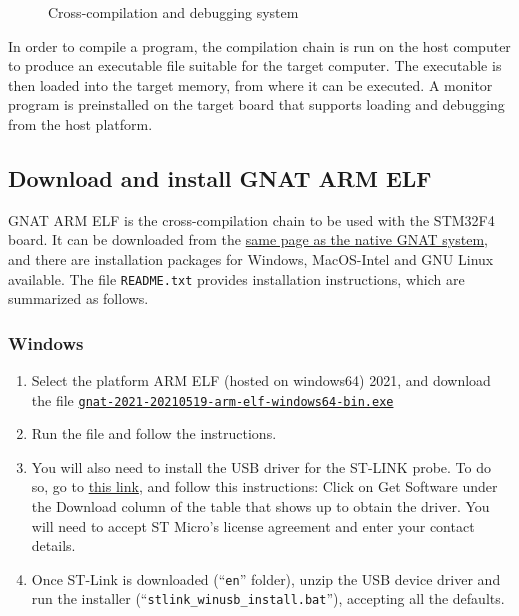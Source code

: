 \begin{figure}[hbtp!]
    \caption{Cross-compilation and debugging system}
    \label{fig:cross}
\end{figure}

In order to compile a program, the compilation chain is run on the host computer to produce an executable file suitable for the target computer.
The executable is then loaded into the target memory,
from where it can be executed.
A monitor program is preinstalled on the target board
that supports loading and debugging from the host platform.

\subsection{Download and install GNAT ARM ELF}

GNAT ARM ELF is the cross-compilation chain to be used with the STM32F4 board. It can be downloaded from the
\href{https://www.adacore.com/download/more}{same page as the native GNAT system},
and there are installation packages for Windows, MacOS-Intel and GNU Linux available.
The file \texttt{README.txt} provides installation instructions,
which are summarized as follows.

\subsubsection*{Windows}
\begin{enumerate}
\item Select the platform ARM ELF (hosted on windows64) 2021, and download the file
\href{https://community.download.adacore.com/v1/3af961d8c675e36d87934450bc6356a84a0d753b?filename=gnat-2021-20210519-arm-elf-windows64-bin.exe&rand=444}{\nolinkurl{gnat-2021-20210519-arm-elf-windows64-bin.exe}}
\item Run the file and follow the instructions.
\item You will also need to install the USB driver for the ST-LINK probe. To do so, go to \href{http://www.st.com/content/st\_com/en/products/embedded-software/development-tool-software/stsw-link009.html}{this link}, and follow this instructions: Click on Get Software under the Download column of the table that shows up to obtain the driver. You will need to accept ST Micro’s license agreement and enter your contact details.
\item  Once ST-Link is downloaded (``\texttt{en}'' folder), unzip the USB device driver and run the installer (``\texttt{stlink\_winusb\_install.bat}''), accepting all the defaults.
\end{enumerate}

